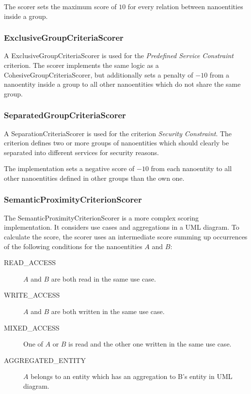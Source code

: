 The scorer sets the maximum score of $10$ for every relation between nanoentities inside a group. 

\subsubsection{ExclusiveGroupCriteriaScorer}

A ExclusiveGroupCriteriaScorer is used for the \textit{Predefined Service Constraint} criterion. The scorer implements the same logic as a CohesiveGroupCriteriaScorer, but additionally sets a penalty of $-10$ from a nanoentity inside a group to all other nanoentities which do not share the same group.

\subsubsection{SeparatedGroupCriteriaScorer}

A SeparationCriteriaScorer is used for the criterion \textit{Security Constraint}. The criterion defines two or more groups of nanoentities which should clearly be separated into different services for security reasons. 

The implementation sets a negative score of $-10$ from each nanoentity to all other nanoentities defined in other groups than the own one. 

\subsubsection{SemanticProximityCriterionScorer}

The SemanticProximityCriterionScorer is a more complex scoring implementation. It considers use cases and aggregations in a UML diagram. To calculate the score, the scorer uses an intermediate score summing up occurrences of the following conditions for the nanoentities $A$ and $B$:

\begin{description}
	\item [READ\_ACCESS] $A$ and $B$ are both read in the same use case.
	\item [WRITE\_ACCESS] $A$ and $B$ are both written in the same use case.
	\item [MIXED\_ACCESS] One of $A$ or $B$ is read and the other one written in the same use case.
	\item [AGGREGATED\_ENTITY] $A$ belongs to an entity which has an aggregation to B's entity in UML diagram. 
\end{description}

